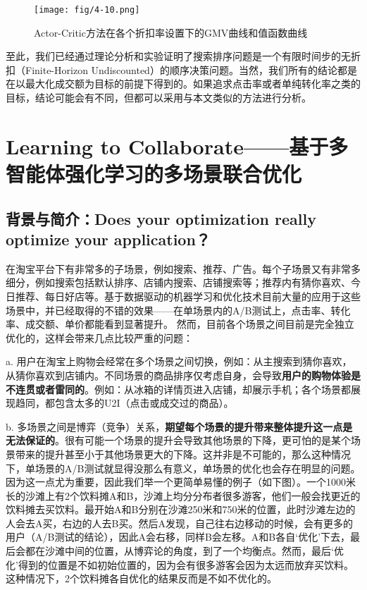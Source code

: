 \begin{figure}[!h]
\centering
\texttt{[image: fig/4-10.png]}
\caption{ Actor-Critic方法在各个折扣率设置下的GMV曲线和值函数曲线}
\end{figure}

至此，我们已经通过理论分析和实验证明了搜索排序问题是一个有限时间步的无折扣（Finite-Horizon Undiscounted）的顺序决策问题。当然，我们所有的结论都是在以最大化成交额为目标的前提下得到的。如果追求点击率或者单纯转化率之类的目标，结论可能会有不同，但都可以采用与本文类似的方法进行分析。



\section{Learning to Collaborate——基于多智能体强化学习的多场景联合优化}
\subsection{背景与简介：Does your optimization really optimize your application？}
在淘宝平台下有非常多的子场景，例如搜索、推荐、广告。每个子场景又有非常多细分，例如搜索包括默认排序、店铺内搜索、店铺搜索等；推荐内有猜你喜欢、今日推荐、每日好店等。基于数据驱动的机器学习和优化技术目前大量的应用于这些场景中，并已经取得的不错的效果——在单场景内的A/B测试上，点击率、转化率、成交额、单价都能看到显著提升。
然而，目前各个场景之间目前是完全独立优化的，这样会带来几点比较严重的问题：

    a. 用户在淘宝上购物会经常在多个场景之间切换，例如：从主搜索到猜你喜欢，从猜你喜欢到店铺内。不同场景的商品排序仅考虑自身，会导致\textbf{用户的购物体验是不连贯或者雷同的}。例如：从冰箱的详情页进入店铺，却展示手机；各个场景都展现趋同，都包含太多的U2I（点击或成交过的商品）。

    b. 多场景之间是博弈（竞争）关系，\textbf{期望每个场景的提升带来整体提升这一点是无法保证的}。很有可能一个场景的提升会导致其他场景的下降，更可怕的是某个场景带来的提升甚至小于其他场景更大的下降。这并非是不可能的，那么这种情况下，单场景的A/B测试就显得没那么有意义，单场景的优化也会存在明显的问题。因为这一点尤为重要，因此我们举一个更简单易懂的例子（如下图）。一个1000米长的沙滩上有2个饮料摊A和B，沙滩上均分分布者很多游客，他们一般会找更近的饮料摊去买饮料。最开始A和B分别在沙滩250米和750米的位置，此时沙滩左边的人会去A买，右边的人去B买。然后A发现，自己往右边移动的时候，会有更多的用户（A/B测试的结论），因此A会右移，同样B会左移。A和B各自‘优化’下去，最后会都在沙滩中间的位置，从博弈论的角度，到了一个均衡点。然而，最后‘优化’得到的位置是不如初始位置的，因为会有很多游客会因为太远而放弃买饮料。这种情况下，2个饮料摊各自优化的结果反而是不如不优化的。

